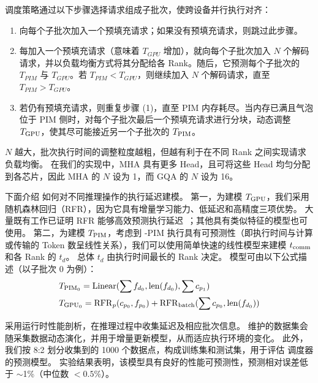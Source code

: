 调度策略通过以下步骤选择请求组成子批次，使跨设备并行执行对齐：
\begin{enumerate}
  \item 向每个子批次加入一个预填充请求；如果没有预填充请求，则跳过此步骤。
  \item 每加入一个预填充请求（意味着 $T_{GPU}$ 增加），\sys 就向每个子批次加入 $N$ 个解码请求，并以负载均衡方式将其分配给各 Rank。随后，它预测每个子批次的 $T_{PIM}$ 与 $T_{GPU}$。若 $T_{PIM}<T_{GPU}$，则继续加入 $N$ 个解码请求，直至 $T_{PIM}>T_{GPU}$。
  \item 若仍有预填充请求，则重复步骤 (1)，直至 PIM 内存耗尽。当内存已满且气泡位于 PIM 侧时，对每个子批次最后一个预填充请求进行分块，动态调整 $T_{\rm GPU}$，使其尽可能接近另一个子批次的 $T_{\rm PIM}$。
\end{enumerate}

$N$ 越大，批次执行时间的调整粒度越粗，但越有利于在不同 Rank 之间实现请求负载均衡。
在我们的实现中，MHA 具有更多 Head，且可将这些 Head 均匀分配到各芯片，因此 MHA 的 $N$ 设为 1，而 GQA 的 $N$ 设为 16。

\label{sec:runtime-profiling}
下面介绍 \sys 如何对不同推理操作的执行延迟建模。
第一，为建模 $T_{\rm GPU}$，我们采用随机森林回归（RFR），因为它具有增量学习能力、低延迟和高精度三项优势。
大量既有工作已证明 RFR 能够高效预测执行延迟~\cite{liu2024jiagu,zhao2021gsight}；其他具有类似特征的模型也可使用。
第二，为建模 $T_{\rm PIM}$，考虑到 \sys-PIM 执行具有可预测性（即执行时间与计算或传输的 Token 数呈线性关系），我们可以使用简单快速的线性模型来建模 $t_{\rm comm}$ 和各 Rank 的 $t_d$。
总体 $t_d$ 由执行时间最长的 Rank 决定。
模型可由以下公式描述（以子批次 0 为例）：
\begin{align*}
  &T_{{\rm PIM}_{0}} = {\rm Linear}(\sum{f_{d_0}}, {\rm len}(f_{d_0}), \sum{c_{p_1}}) \\
  &T_{{\rm GPU}_{0}} = {\rm RFR}_p(c_{p_0}, f_{p_0}) + {\rm RFR}_{\rm batch}(\sum{c_{p_0}}, {\rm len}(f_{d_0}))
\end{align*}

\sys 采用运行时性能剖析，在推理过程中收集延迟及相应批次信息。
\sys 维护的数据集会随采集数据动态演化，并用于增量更新模型，从而适应执行环境的变化。
此外，我们按 8:2 划分收集到的 1000 个数据点，构成训练集和测试集，用于评估 \sys 调度器的预测模型。
实验结果表明，该模型具有良好的性能可预测性，预测相对误差低于 $\sim$1\%（中位数 $<0.5\%$）。

